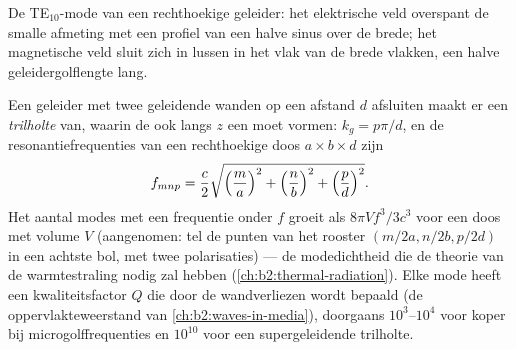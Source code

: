\begin{omfigure}

{\small De TE$_{10}$-mode van een rechthoekige geleider: het elektrische
veld overspant de smalle afmeting met een profiel van een halve sinus over
de brede; het magnetische veld sluit zich in lussen in het vlak van de brede
vlakken, een halve geleidergolflengte lang.}
\end{omfigure}

\begin{proposition}[Trilholte]\label{prop:b2:guided-waves:cavity}
Een geleider met twee geleidende wanden op een afstand $d$ afsluiten maakt
er een \emph{trilholte} van, waarin de  ook langs $z$ een
 moet vormen: $k_g = p\pi/d$, en de resonantiefrequenties van
een rechthoekige doos $a \times b \times d$ zijn
\[
f_{mnp} = \frac c2\sqrt{\Bigl(\frac ma\Bigr)^2 + \Bigl(\frac nb\Bigr)^2 + \Bigl(\frac pd\Bigr)^2} .
\]
Het aantal modes met een frequentie onder $f$ groeit als $8\pi V f^3/3c^3$
voor een doos met volume $V$ (aangenomen: tel de punten van het rooster
$(m/2a, n/2b, p/2d)$ in een achtste bol, met twee polarisaties) --- de
modedichtheid die de theorie van de warmtestraling nodig zal hebben
(\cref{ch:b2:thermal-radiation}). Elke mode heeft een kwaliteitsfactor $Q$
die door de wandverliezen wordt bepaald (de oppervlakteweerstand van
\cref{ch:b2:waves-in-media}), doorgaans $10^3$--$10^4$ voor koper bij
microgolffrequenties en $10^{10}$ voor een supergeleidende trilholte.
\end{proposition}

